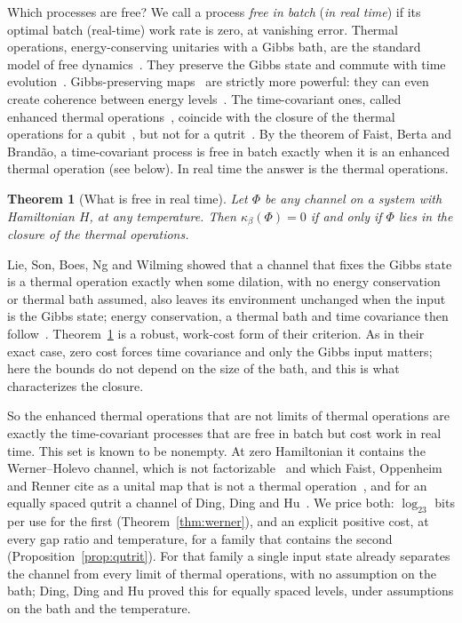 \documentclass[11pt]{article}
\newtheorem{theorem}{Theorem}
\theoremstyle{definition}
\theoremstyle{remark}
\newcommand{\Trt}{\kappa_\beta}
\begin{document}
Which processes are free? We call a process \emph{free in batch} (\emph{in real time}) if its optimal batch (real-time) work rate is zero, at vanishing error. Thermal operations, energy-conserving unitaries with a Gibbs bath, are the standard model of free dynamics~\cite{Janzing00,HorodeckiOppenheim13,Brandao13}. They preserve the Gibbs state and commute with time evolution~\cite{Lostaglio15}. Gibbs-preserving maps~\cite{Janzing00,FDOR15,FR18} are strictly more powerful: they can even create coherence between energy levels~\cite{FOR15}. The time-covariant ones, called enhanced thermal operations~\cite{Cwiklinski15}, coincide with the closure of the thermal operations for a qubit~\cite{Cwiklinski15,vomEnde22}, but not for a qutrit~\cite{Cwiklinski15,DingFengHu21}. By the theorem of Faist, Berta and Brand\~ao, a time-covariant process is free in batch exactly when it is an enhanced thermal operation (see below). In real time the answer is the thermal operations.

\begin{theorem}[What is free in real time]\label{thm:free}
Let $\Phi$ be any channel on a system with Hamiltonian $H$, at any temperature. Then $\Trt(\Phi)=0$ if and only if $\Phi$ lies in the closure of the thermal operations.
\end{theorem}

Lie, Son, Boes, Ng and Wilming showed that a channel that fixes the Gibbs state is a thermal operation exactly when some dilation, with no energy conservation or thermal bath assumed, also leaves its environment unchanged when the input is the Gibbs state; energy conservation, a thermal bath and time covariance then follow~\cite[Prop.~4]{LieEtAl26}. Theorem~\ref{thm:free} is a robust, work-cost form of their criterion. As in their exact case, zero cost forces time covariance and only the Gibbs input matters; here the bounds do not depend on the size of the bath, and this is what characterizes the closure.

So the enhanced thermal operations that are not limits of thermal operations are exactly the time-covariant processes that are free in batch but cost work in real time. This set is known to be nonempty. At zero Hamiltonian it contains the Werner--Holevo channel, which is not factorizable~\cite[Ex.~3.1]{HaagerupMusat11} and which Faist, Oppenheim and Renner cite as a unital map that is not a thermal operation~\cite{FOR15}, and for an equally spaced qutrit a channel of Ding, Ding and Hu~\cite{DingFengHu21}. We price both: $\log_23$ bits per use for the first (Theorem~\ref{thm:werner}), and an explicit positive cost, at every gap ratio and temperature, for a family that contains the second (Proposition~\ref{prop:qutrit}). For that family a single input state already separates the channel from every limit of thermal operations, with no assumption on the bath; Ding, Ding and Hu proved this for equally spaced levels, under assumptions on the bath and the temperature.
\end{document}
